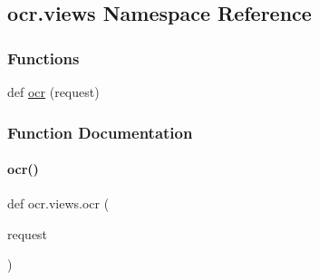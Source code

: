 \hypertarget{namespaceocr_1_1views}{}\subsection{ocr.\+views Namespace Reference}
\label{namespaceocr_1_1views}
\subsubsection*{Functions}
\begin{DoxyCompactItemize}
\item 
def \hyperlink{namespaceocr_1_1views_a1fc1738b0622d1cfcc85bfb8adeeec67}{ocr} (request)
\end{DoxyCompactItemize}


\subsubsection{Function Documentation}
\mbox{\label{namespaceocr_1_1views_a1fc1738b0622d1cfcc85bfb8adeeec67}} 
\paragraph{\texorpdfstring{ocr()}{ocr()}}
{\footnotesize\ttfamily def ocr.\+views.\+ocr (\begin{DoxyParamCaption}\item[{}]{request }\end{DoxyParamCaption})}

